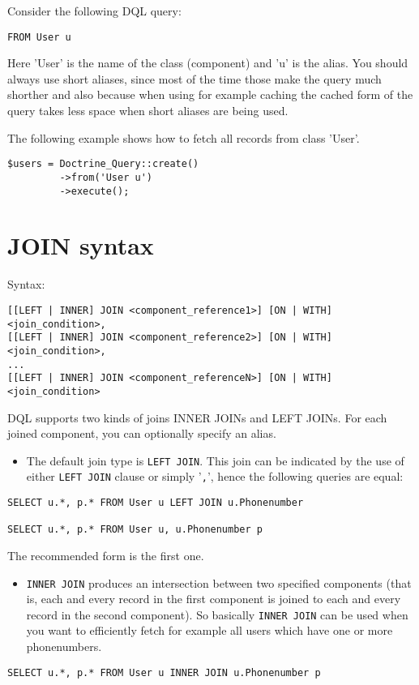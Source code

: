 \documentclass[11pt,a4paper]{report}
\begin{document}
Consider the following DQL query:

\begin{verbatim}
FROM User u
\end{verbatim}

Here 'User' is the name of the class (component) and 'u' is the alias. You should always use short aliases, since most of the time those make the query much shorther and also because when using for example caching the cached form of the query takes less space when short aliases are being used.

The following example shows how to fetch all records from class 'User'.

\begin{verbatim}
$users = Doctrine_Query::create()
         ->from('User u')
         ->execute();
\end{verbatim}

\section{JOIN syntax}
Syntax:

\begin{verbatim}
[[LEFT | INNER] JOIN <component_reference1>] [ON | WITH] <join_condition>,
[[LEFT | INNER] JOIN <component_reference2>] [ON | WITH] <join_condition>,
...
[[LEFT | INNER] JOIN <component_referenceN>] [ON | WITH] <join_condition>
\end{verbatim}

DQL supports two kinds of joins INNER JOINs and LEFT JOINs. For each joined component, you can optionally specify an alias.

\begin{itemize}
\item{The default join type is \texttt{LEFT JOIN}. This join can be indicated by the use of either \texttt{LEFT JOIN} clause or simply '\texttt{,}', hence the following queries are equal:}
\end{itemize}
\begin{verbatim}
SELECT u.*, p.* FROM User u LEFT JOIN u.Phonenumber

SELECT u.*, p.* FROM User u, u.Phonenumber p
\end{verbatim}

The recommended form is the first one.

\begin{itemize}
\item{\texttt{INNER JOIN} produces an intersection between two specified components (that is, each and every record in the first component is joined to each and every record in the second component). So basically \texttt{INNER JOIN} can be used when you want to efficiently fetch for example all users which have one or more phonenumbers.}
\end{itemize}
\begin{verbatim}
SELECT u.*, p.* FROM User u INNER JOIN u.Phonenumber p
\end{verbatim}
\end{document}
